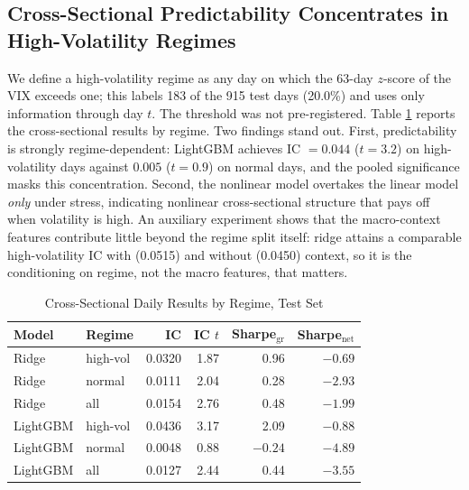 \documentclass[conference]{IEEEtran}
\begin{document}
\subsection{Cross-Sectional Predictability Concentrates in High-Volatility Regimes}
We define a high-volatility regime as any day on which the 63-day $z$-score of the
VIX exceeds one; this labels 183 of the 915 test days (20.0\%) and uses only information through day $t$. The threshold was not pre-registered. Table \ref{tab:xsregime} reports the cross-sectional results by regime. Two
findings stand out. First, predictability is strongly regime-dependent: LightGBM
achieves IC $=0.044$ ($t=3.2$) on high-volatility days against $0.005$ ($t=0.9$) on
normal days, and the pooled significance masks this concentration. Second, the
nonlinear model overtakes the linear model \emph{only} under stress, indicating
nonlinear cross-sectional structure that pays off when volatility is high. An
auxiliary experiment shows that the macro-context features contribute little beyond
the regime split itself: ridge attains a comparable high-volatility IC with (0.0515) and without (0.0450) context, so it is the conditioning on regime, not the macro features, that
matters.

\begin{table}[t]
\caption{Cross-Sectional Daily Results by Regime, Test Set}
\label{tab:xsregime}
\centering
\small
\begin{tabular}{@{}llrrrr@{}}
\toprule
Model & Regime & IC & IC $t$ & Sharpe$_{\text{gr}}$ & Sharpe$_{\text{net}}$ \\
\midrule
Ridge    & high-vol & 0.0320 & 1.87 & 0.96 & $-0.69$ \\
Ridge    & normal   & 0.0111 & 2.04 & 0.28 & $-2.93$ \\
Ridge    & all      & 0.0154 & 2.76 & 0.48 & $-1.99$ \\
LightGBM & high-vol & 0.0436 & 3.17 & 2.09 & $-0.88$ \\
LightGBM & normal   & 0.0048 & 0.88 & $-0.24$ & $-4.89$ \\
LightGBM & all      & 0.0127 & 2.44 & 0.44 & $-3.55$ \\
\bottomrule
\end{tabular}
\end{table}
\end{document}
